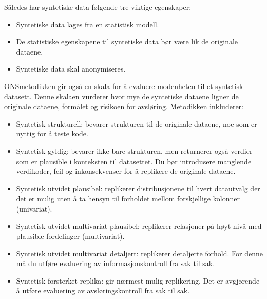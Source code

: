 \documentclass[letterpaper,10pt,english]{jupyterBook}
\begin{document}
\sphinxAtStartPar
Således har syntetiske data følgende tre viktige egenskaper:
\begin{itemize}
\item {} 
\sphinxAtStartPar
Syntetiske data lages fra en statistisk modell.

\item {} 
\sphinxAtStartPar
De statistiske egenskapene til syntetiske data bør være lik de originale dataene.

\item {} 
\sphinxAtStartPar
Syntetiske data skal anonymiseres.

\end{itemize}

\sphinxAtStartPar
ONS\sphinxhyphen{}metodikken gir også en skala for å evaluere modenheten til et syntetisk datasett. Denne skalaen vurderer hvor mye de syntetiske dataene ligner de originale dataene, formålet og risikoen for avsløring. Metodikken inkluderer:
\begin{itemize}
\item {} 
\sphinxAtStartPar
Syntetisk strukturell: bevarer strukturen til de originale dataene, noe som er nyttig for å teste kode.

\item {} 
\sphinxAtStartPar
Syntetisk gyldig: bevarer ikke bare strukturen, men returnerer også verdier som er plausible i konteksten til datasettet. Du bør introdusere manglende verdikoder, feil og inkonsekvenser for å replikere de originale dataene.

\item {} 
\sphinxAtStartPar
Syntetisk utvidet plausibel: replikerer distribusjonene til hvert datautvalg der det er mulig uten å ta hensyn til forholdet mellom forskjellige kolonner (univariat).

\item {} 
\sphinxAtStartPar
Syntetisk utvidet multivariat plausibel: replikerer relasjoner på høyt nivå med plausible fordelinger (multivariat).

\item {} 
\sphinxAtStartPar
Syntetisk utvidet multivariat detaljert: replikerer detaljerte forhold. For denne må du utføre evaluering av informasjonskontroll fra sak til sak.

\item {} 
\sphinxAtStartPar
Syntetisk forsterket replika: gir nærmest mulig replikering. Det er avgjørende å utføre evaluering av avsløringskontroll fra sak til sak.

\end{itemize}
\end{document}
